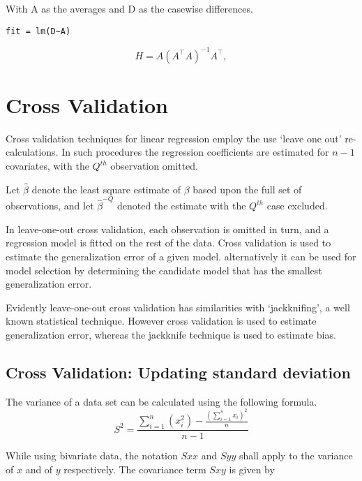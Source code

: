 With A as the averages and D as the casewise differences.
\begin{verbatim}
fit = lm(D~A)
\end{verbatim}

\begin{displaymath}
H = A \left(A^\top  A\right)^{-1} A^\top ,
\end{displaymath}

\newpage
\section{Cross Validation} %

Cross validation techniques for linear regression employ the use `leave one out' re-calculations. In such procedures the regression coefficients are estimated for $n-1$ covariates, with the $Q^{th}$ observation omitted.

Let $\hat{\beta}$ denote the least square estimate of $\beta$ based upon the full set of observations, and let
$\hat{\beta}^{-Q}$ denoted the estimate with the $Q^{th}$ case
excluded.


In leave-one-out cross validation, each observation is omitted in turn, and a regression model is fitted on the rest of the data. Cross validation is used to estimate the generalization error of a given model. alternatively it can be used for model selection by determining the candidate model that has the smallest generalization error.


Evidently leave-one-out cross validation has similarities with `jackknifing', a well known statistical technique. However cross validation is used to estimate generalization error, whereas the jackknife technique is used to estimate bias.

\subsection{Cross Validation: Updating standard deviation} %

The variance of a data set can be calculated using the following formula.
\begin{equation}
S^{2}=\frac{\sum_{i=1}^{n}(x_{i}^{2})-\frac{(\sum_{i=1}^{n}x_{i})^{2}}{n}}{n-1}
\end{equation}

While using bivariate data, the notation $Sxx$ and $Syy$ shall apply to the variance of $x$ and of $y$ respectively. The covariance term $Sxy$ is given by


